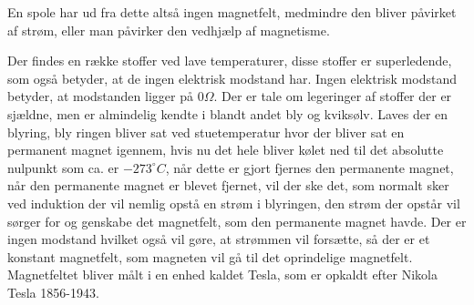 En spole har ud fra dette altså ingen magnetfelt, medmindre den bliver påvirket af strøm, eller man påvirker den vedhjælp af magnetisme. 

Der findes en række stoffer ved lave temperaturer, disse stoffer er superledende, som også betyder, at de ingen elektrisk modstand har. Ingen elektrisk modstand betyder, at modstanden ligger på $0 \Omega$. Der er tale om legeringer af stoffer der er sjældne, men er almindelig kendte i blandt andet bly og kviksølv. Laves der en blyring, bly ringen bliver sat ved stuetemperatur hvor der bliver sat en permanent magnet igennem, hvis nu det hele bliver kølet ned til det absolutte nulpunkt som ca. er $-273^\circ C$, når dette er gjort fjernes den permanente magnet, når den permanente magnet er blevet fjernet, vil der ske det, som normalt sker ved induktion der vil nemlig opstå en strøm i blyringen, den strøm der opstår vil sørger for og genskabe det magnetfelt, som den permanente magnet havde. Der er ingen modstand hvilket også vil gøre, at strømmen vil forsætte, så der er et konstant magnetfelt, som magneten vil gå til det oprindelige magnetfelt. Magnetfeltet bliver målt i en enhed kaldet Tesla, som er opkaldt efter Nikola Tesla 1856-1943.\cite{spoler}


